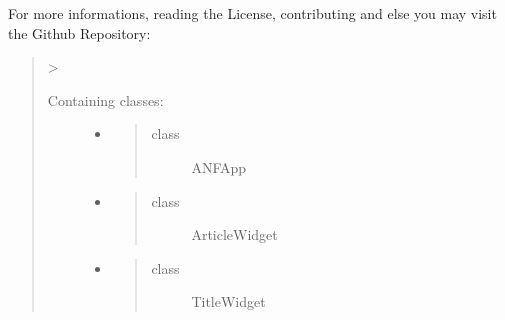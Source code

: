 \documentclass[letterpaper,10pt,english]{sphinxmanual}
\begin{document}
For more informations, reading the License,
contributing and else you may visit
the Github Repository:
\begin{quote}

\textendash{}\textgreater{} 
\begin{description}
\item[{Containing classes:}] \leavevmode\begin{itemize}
\item {} \begin{quote}\begin{description}
\item[{class}] \leavevmode
ANFApp

\end{description}\end{quote}

\item {} \begin{quote}\begin{description}
\item[{class}] \leavevmode
ArticleWidget

\end{description}\end{quote}

\item {} \begin{quote}\begin{description}
\item[{class}] \leavevmode
TitleWidget

\end{description}\end{quote}

\end{itemize}

\end{description}
\end{quote}
\end{document}

